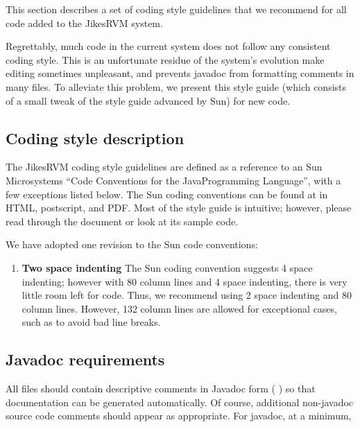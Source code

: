 This section describes a set of coding style guidelines that we
recommend for all code added to the Jikes\trademark RVM  system.  

Regrettably, much code in the current system does not follow any consistent
coding style.  This is an unfortunate residue of the system's evolution 
make editing sometimes unpleasant, and prevents javadoc from
formatting comments in
many files.  To alleviate this problem, we present this style guide 
(which consists of a small tweak of the style guide advanced by Sun) 
for new code. 


\subsection {Coding style description}

The Jikes\trademark RVM coding style guidelines are defined as a
reference to an Sun 
Microsystems ``Code Conventions for the Java\trademark Programming Language'',
with a few exceptions listed below.  The Sun coding
conventions can be found at 
\xlink{{\tt \SunCodeConventionURL}} {\SunCodeConventionURL} in HTML,
postscript, and PDF.  Most of the style guide is intuitive; 
however, please read through the document or look at its sample code.

We have adopted one revision to the Sun code conventions:
\begin{enumerate}
\item {\bf Two space indenting} The Sun coding convention suggests 4
space indenting; however with 80 column lines and 4 space indenting,
there is very little room left for code.  Thus, we recommend using 2
space indenting and 80 column lines.   However,
132 column lines are allowed for exceptional cases, such as to avoid
bad line breaks.

\end{enumerate}

\JikesTMFooter

\JavaTMFooter

\subsection {Javadoc requirements}

All files should contain descriptive comments
in Javadoc form (
\xlink{{\tt \JavadocURL}} {\JavadocURL}
) so
that documentation can be generated automatically.  Of course,
additional non-javadoc source code comments should appear as
appropriate.
For javadoc, at a minimum,


